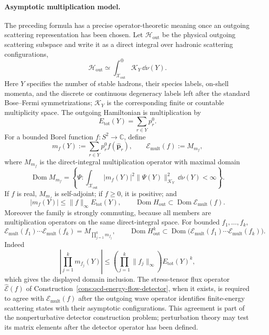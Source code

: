 \paragraph{Asymptotic multiplication model.}
The preceding formula has a precise operator-theoretic meaning once an
outgoing scattering representation has been chosen.  Let
\(\mathcal H_{\mathrm{out}}\) be the physical outgoing scattering subspace and
write it as a direct integral over hadronic scattering configurations,
\[
  \mathcal H_{\mathrm{out}}
  \simeq
  \int_{\mathcal X_{\mathrm{out}}}^{\oplus}\mathcal K_Y\,\dd\nu(Y).
\]
Here \(Y\) specifies the number of stable hadrons, their species labels,
on-shell momenta, and the discrete or continuous degeneracy labels left after
the standard Bose--Fermi symmetrizations; \(\mathcal K_Y\) is the
corresponding finite or countable multiplicity space.  The outgoing
Hamiltonian is multiplication by
\[
  E_{\mathrm{tot}}(Y)=\sum_{r\in Y}p_r^0 .
\]
For a bounded Borel function \(f:S^2\to\mathbb C\), define
\begin{equation}
  m_f(Y):=\sum_{r\in Y}p_r^0 f(\widehat{\mathbf p}_r),
  \qquad
  \mathcal E_{\mathrm{mult}}(f):=M_{m_f},
  \label{eq:energy-detector-multiplication-symbol}
\end{equation}
where \(M_{m_f}\) is the direct-integral multiplication operator with maximal
domain
\[
  \operatorname{Dom} M_{m_f}
  =
  \left\{\Psi:
  \int_{\mathcal X_{\mathrm{out}}}
  |m_f(Y)|^2\|\Psi(Y)\|_{\mathcal K_Y}^2\,\dd\nu(Y)<\infty
  \right\}.
\]
If \(f\) is real, \(M_{m_f}\) is self-adjoint; if \(f\geq0\), it is positive;
and
\begin{equation}
  |m_f(Y)|\leq \|f\|_\infty E_{\mathrm{tot}}(Y),
  \qquad
  \operatorname{Dom} H_{\mathrm{out}}
  \subset
  \operatorname{Dom} \mathcal E_{\mathrm{mult}}(f).
  \label{eq:energy-detector-hamiltonian-bound}
\end{equation}
Moreover the family is strongly commuting, because all members are
multiplication operators on the same direct-integral space.  For bounded
\(f_1,\ldots,f_k\),
\begin{equation}
  \mathcal E_{\mathrm{mult}}(f_1)\cdots
  \mathcal E_{\mathrm{mult}}(f_k)
  =
  M_{\prod_{j=1}^k m_{f_j}},
  \qquad
  \operatorname{Dom} H_{\mathrm{out}}^k
  \subset
  \operatorname{Dom}
  \bigl(\mathcal E_{\mathrm{mult}}(f_1)\cdots
  \mathcal E_{\mathrm{mult}}(f_k)\bigr).
  \label{eq:energy-detector-product-domain}
\end{equation}
Indeed
\[
  \left|\prod_{j=1}^k m_{f_j}(Y)\right|
  \leq
  \left(\prod_{j=1}^k\|f_j\|_\infty\right)
  E_{\mathrm{tot}}(Y)^k ,
\]
which gives the displayed domain inclusion.  The stress-tensor flux operator
\(\widehat{\mathcal E}(f)\) of
Construction~\ref{cons:qcd-energy-flow-detector}, when it exists, is required
to agree with \(\mathcal E_{\mathrm{mult}}(f)\) after the outgoing wave
operator identifies finite-energy scattering states with their asymptotic
configurations.  This agreement is part of the nonperturbative detector
construction problem; perturbation theory may test its matrix elements after
the detector operator has been defined.

